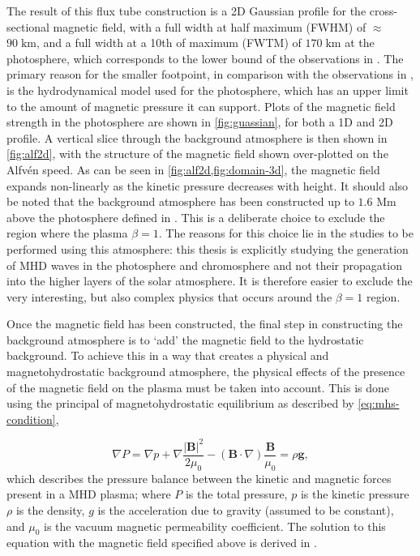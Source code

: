 \documentclass[a4paper,12pt,fourier,authoryear,custommargin]{Classes/PhDThesisPSnPDF}
\renewcommand{\vec}{\mathbf}
\begin{document}
The result of this flux tube construction is a 2D Gaussian profile for the cross-sectional magnetic field, with a full width at half maximum (FWHM) of $\approx$ $90 \; \mathrm{km}$, and a full width at a 10th of maximum (FWTM) of $170 \; \mathrm{km}$
at the photosphere, which corresponds to the lower bound of the observations in \cite{sanchezalmeida2004}.
The primary reason for the smaller footpoint, in comparison with the observations in \cite{utz2013}, is the hydrodynamical model used for the photosphere, which has an upper limit to the amount of magnetic pressure it can support.
Plots of the magnetic field strength in the photosphere are shown in \cref{fig:guassian}, for both a 1D and 2D profile.
A vertical slice through the background atmosphere is then shown in \cref{fig:alf2d}, with the structure of the magnetic field shown over-plotted on the Alfv\'en speed.
As can be seen in \cref{fig:alf2d,fig:domain-3d}, the magnetic field expands non-linearly as the kinetic pressure decreases with height.
It should also be noted that the background atmosphere has been constructed up to $1.6$ Mm above the photosphere defined in \cite{vernazza1981}.
This is a deliberate choice to exclude the region where the plasma $\beta = 1$.
The reasons for this choice lie in the studies to be performed using this atmosphere: this thesis is explicitly studying the generation of MHD waves in the photosphere and chromosphere and not their propagation into the higher layers of the solar atmosphere.
It is therefore easier to exclude the very interesting, but also complex physics that occurs around the $\beta = 1$ region.

Once the magnetic field has been constructed, the final step in constructing the background atmosphere is to `add' the magnetic field to the hydrostatic background.
To achieve this in a way that creates a physical and magnetohydrostatic background atmosphere, the physical effects of the presence of the magnetic field on the plasma must be taken into account.
This is done using the principal of magnetohydrostatic equilibrium as described by \cref{eq:mhs-condition},

\begin{equation}
\nabla P = 
\nabla p + \nabla \frac{|\vec{B}|^2}{2\mu_0} - (\vec{B}\cdot\nabla)
{\frac{\vec{B}}{\mu_0} }
= \rho \vec{g}, 
\label{eq:mhs-condition}
\end{equation}
which describes the pressure balance between the kinetic and magnetic forces present in a MHD plasma;
where $P$ is the total pressure, $p$ is the kinetic pressure $\rho$ is the density, $g$ is the acceleration due to gravity (assumed to be constant), and $\mu_0$ is the vacuum magnetic permeability coefficient.
The solution to this equation with the magnetic field specified above is derived in \cite{gent2013,gent2014}.
\end{document}
